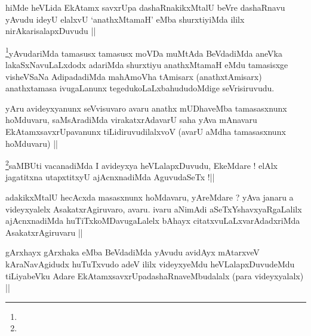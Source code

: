 \begin{artha}
hiMde heVLida EkAtamx savxrUpa dashaRnakikxMtalU beVre dashaRnavu
yAvudu ideyU elalxvU `anathxMtamaH' eMba shurxtiyiMda ililx
nirAkarisalapxDuvudu ||
\end{artha}


\begin{artha}
\footnote{}yAvudariMda tamasusx tamasusx moVDa muMtAda BeVdadiMda
aneVka lakaSxNavuLaLxdodx adariMda shurxtiyu anathxMtamaH eMdu
tamasisxge visheVSaNa AdipadadiMda mahAmoVha tAmisarx (anathxtAmisarx)
anathxtamasa ivugaLanunx tegedukoLaLxbahududoMdige seVrisiruvudu.
\end{artha}

\begin{artha}
yAru avideyxyanunx seVvisuvaro avaru anathx mUDhaveMba tamasasxnunx
hoMduvaru, saMsAradiMda virakatxrAdavarU saha yAva mAnavaru
EkAtamxsavxrUpavanunx tiLidiruvudilalxvoV (avarU aMdha tamasasxnunx
hoMduvaru) ||
\end{artha}


\begin{artha}
\footnote{}saMBUti vacanadiMda I avideyxya heVLalapxDuvudu, EkeMdare !
elAlx jagatitxna utapxtitxyU ajAcnxnadiMda AguvudaSeTx !||
\end{artha}


\begin{artha}
adakikxMtalU hecAcxda masasxnunx hoMdavaru, yAreMdare ? yAva janaru a
videyxyalelx AsakatxrAgiruvaro, avaru. ivaru aNimAdi
aSeTxYshavxyaRgaLalilx ajAcnxnadiMda huTiTxkoMDavugaLalelx bAhayx
citatxvuLaLxvarAdadxriMda AsakatxrAgiruvaru ||
\end{artha}


\begin{artha}
gArxhayx gArxhaka eMba BeVdadiMda yAvudu avidAyx mAtarxveV
kAraNavAgidudx huTuTxvudo adeV ililx videyxyeMdu heVLalapxDuvudeMdu
tiLiyabeVku Adare EkAtamxsavxrUpadashaRnaveMbudalalx (para
videyxyalalx) ||
\end{artha}

